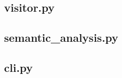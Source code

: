\documentclass[a4paper,8pt]{article}
\begin{document}
\subsection{visitor.py}
\begin{small}
  
\end{small}
\newpage
\subsection{semantic\_analysis.py}
\begin{small}
  
\end{small}
\newpage
\subsection{cli.py}
\begin{small}
  
\end{small}
\newpage
\end{document}
